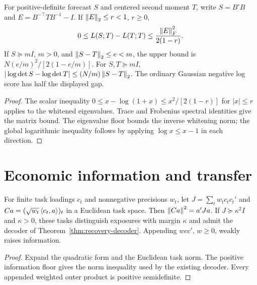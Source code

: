 \begin{theorem}\label{thm:score-local-stability}
  \leanok
  For positive-definite forecast $S$ and centered second moment $T$, write
  $S=B'B$ and $E=B^{-\top}TB^{-1}-I$. If $\left\lVert E\right\rVert_2\le r<1$, $r\ge0$,
  \[
    0\le L(S;T)-L(T;T)\le\frac{\left\lVert E\right\rVert_F^2}{2(1-r)}.
  \]
  If $S\succeq mI$, $m>0$, and $\left\lVert S-T\right\rVert_2\le e<m$, the upper bound is
  $N(e/m)^2/[2(1-e/m)]$. For $S,T\succeq mI$,
  $|\log\det S-\log\det T|\le(N/m)\left\lVert S-T\right\rVert_2$.
  The ordinary Gaussian negative log score has half the displayed gap.
\end{theorem}
\begin{proof}\leanok
  The scalar inequality $0\le x-\log(1+x)\le x^2/[2(1-r)]$ for $|x|\le r$
  applies to the whitened eigenvalues. Trace and Frobenius spectral identities
  give the matrix bound. The eigenvalue floor bounds the inverse whitening
  norm; the global logarithmic inequality follows by applying
  $\log x\le x-1$ in each direction.
\end{proof}

\section{Economic information and transfer}\label{sec:bp-information-transfer}

\begin{theorem}\label{thm:task-information}
  \leanok
  For finite task loadings $c_t$ and nonnegative precisions $w_t$, let
  $J=\sum_t w_tc_tc_t'$ and $Ca=(\sqrt{w_t}\left\langle c_t,a\right\rangle)_t$ in a Euclidean
  task space. Then $\left\lVert Ca\right\rVert^2=a'Ja$. If $J\succeq\kappa^2I$ and
  $\kappa>0$, these tasks distinguish exposures with margin $\kappa$ and
  admit the decoder of Theorem~\ref{thm:recovery-decoder}. Appending
  $wcc'$, $w\ge0$, weakly raises information.
\end{theorem}
\begin{proof}\leanok
  Expand the quadratic form and the Euclidean task norm. The positive
  information floor gives the norm inequality used by the existing decoder.
  Every appended weighted outer product is positive semidefinite.
\end{proof}

